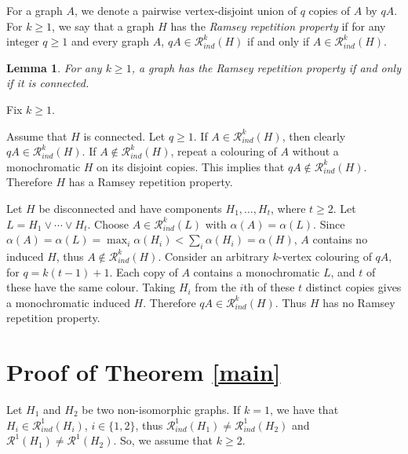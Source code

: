 \documentclass[10pt,a4paper]{article}
\makeatletter
\theoremstyle{plain}
\newtheorem{lemma}[theorem]{Lemma}
\theoremstyle{definition}
\renewenvironment{proof}[1][\proofname]
{\par\pushQED{\qed}
	\normalfont\topsep6\p@\@plus6\p@\relax\trivlist
	\item[\hskip\labelsep\bfseries#1\@addpunct{.}]
	\ignorespaces}
{\popQED\endtrivlist\@endpefalse}
\newcommand{\R}{\mathcal{R}}
\newcommand{\Rk}{\R_{ind}}
\makeatother
\begin{document}
   
For a graph $A$, we denote a pairwise vertex-disjoint union of $q$ copies of $A$ by $qA$.  For $k\geq 1$, we say that a graph $H$ has  the  {\it Ramsey repetition property} if for any  integer $q \geq1$ and every graph $A$,   $ qA\in\Rk^k(H)$ if and only if $A\in\Rk^k(H).$
 \begin{lemma}\label{repetition}
For any $k\geq 1$, a  graph has the Ramsey repetition property if and only if it is connected.
\end{lemma}

\begin{proof}
Fix $k\geq 1$.

Assume that $H$ is connected. Let $q\geq1$. If $A\in\Rk^k(H)$, then clearly $q A\in\Rk^k(H)$.
If $A\not\in\Rk^k(H)$, repeat a colouring of $A$ without a monochromatic $H$ 
on its disjoint copies. This implies that $q A\not \in\Rk^k(H)$. Therefore $H$ has a Ramsey repetition property.

Let $H$  be disconnected and have components $H_1,\ldots,H_t$, where $t\geq2$. Let
$L=H_1\vee\cdots\vee H_t$. Choose
$A\in\Rk^k(L)$ with $ \alpha(A)=\alpha(L)$.     Since $\alpha(A)=\alpha(L)=\max_i\alpha(H_i)<\sum_i\alpha(H_i)=\alpha(H)$,
$A$ contains no induced $H$, thus  $A\not\in \Rk^k(H)$. 
Consider  an arbitrary $k$-vertex colouring of $qA$, for $q=k(t-1)+1$.
Each copy of $A$ contains a  monochromatic
$L$, and $t$ of these have the same colour. Taking $H_i$ from the $i$th
of these $t$ distinct copies gives a monochromatic induced $H$.
Therefore $qA \in \Rk^k(H)$.
Thus $H$ has no Ramsey repetition property.
\end{proof}

 

   

   \section{Proof of Theorem \ref{main}}\label{proof-main}
   Let $H_1$ and $H_2$ be two non-isomorphic graphs. If $k=1$, we have that $H_i\in \Rk^1(H_i)$, $i\in \{1,2\}$,  thus $\Rk^1(H_1)\neq \Rk^1(H_2)$ and  $\R^1(H_1)\neq \R^1(H_2)$.
   So, we assume that  $k\geq 2$.
   
\end{document}
